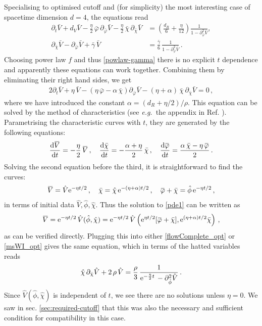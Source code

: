 \documentclass[11pt]{book} %
\newcommand{\overbar}[1]{\mkern 1.5mu\overline{\mkern-1.5mu#1\mkern-1.5mu}\mkern 1.5mu}
\newcommand{\bV}{\overbar V}
\newcommand{\bp}{\overbar \varphi}
\newcommand\eg{\textit{e.g.}\ }
\newcommand{\bc}{\bar \chi}
\newcommand{\hV}{\hat V}
\newcommand{\hp}{\hat \phi}
\newcommand{\hc}{\hat \chi}
\numberwithin{equation}{chapter}
\begin{document}
Specialising to optimised cutoff and (for simplicity) the most interesting case of spacetime dimension $d=4$,
the equations read
\begin{align}
  \label{flowComplete_opt}
  \partial_t\bar{V}+
  d_V \bar V - \frac{\eta}{2} \, \bar \varphi \, \partial_{\bar\varphi}\bar V -\frac{\eta}{2} \, \bar \chi \, \partial_{\bar\chi}\bar V &= \left(  \frac{d_R}{6} + \frac{\eta}{12} \right) \frac{1}{1 -  \partial^2_{\bar\varphi}\bar V},\\
  \label{msWI_opt}
  \partial_{\bar\chi}\bar V - \partial_{\bar\varphi}\bar V + \bar{\gamma} \, \bar V &= \frac{\bar{\gamma}}{6} \, \frac{1}{1 - \partial^2_{\bar\varphi}\bar V}\,.
\end{align}
Choosing power law $f$ and thus \eqref{powlaw-gamma} there is no explicit $t$ dependence and apparently
these equations can work together. Combining them by eliminating their right hand sides, we get
\begin{align}
  \label{pde1}
  2\partial_t\bar{V}+\eta \, \bar{V}-\left(\eta \, \bar\varphi-\alpha \, \bc\right)\partial_{\bar{\varphi}}\bar{V}-(\eta+\alpha) \, \bar\chi \, \partial_{\bar{\chi}} \bar{V}=0\,,
\end{align}
where we have introduced the constant $\alpha = (d_R+\eta/2)/\rho$.
This equation can be solved by the method of characteristics
(see \eg the appendix in Ref. \cite{Dietz:2015owa}). Parametrising the characteristic curves with $t$, they are generated by the following equations:
\begin{align}
  \frac{\mathrm d\bV}{\mathrm dt} = -\frac{\eta}{2} \, \bV\,,
  \quad
  \frac{\mathrm d\bc}{\mathrm dt}=-\frac{\alpha+\eta}{2} \, \bc\,,
  \quad
  \frac{\mathrm d\bp}{\mathrm dt}=\frac{\alpha\,\bc-\eta\,\bp}{2}\,.
\end{align}
Solving the second equation before the third, it is straightforward to find the curves:
\begin{align}
  \bV = \hV {\rm e}^{-\eta t/2}\,,\quad \bc = \hc\, {\rm e}^{-(\eta+\alpha)t/2}\,,\quad \bp+\bc = \hp\, {\rm e}^{-\eta t/2}\,,
\end{align}
in terms of initial data $\hV,\hp,\hc$.
Thus the solution to \eqref{pde1} can be written as
\begin{align}
  \bV ={\rm e}^{-\eta t/2}\, \hV(\hp,\hc) ={\rm e}^{-\eta t/2} \,\hV\left({\rm e}^{\eta t/2}[\bp+\bc],{\rm e}^{(\eta+\alpha)t/2}\bc\right)\,,
\end{align}
as can be verified directly. Plugging this into either \eqref{flowComplete_opt} or \eqref{msWI_opt}
gives the same equation, which in terms of the hatted variables reads
\begin{align}
  \hc \, \partial_{\hc}\hV + 2 \, \rho \, \hV = \frac{\rho}{3} \, \frac{1}{{\rm e}^{-\frac{\eta}{2} t} \,-\partial^2_{\hp}\hV}\,.
\end{align}
Since $\hV(\hp,\hc)$ is independent of $t$, we see there are no solutions unless $\eta=0$.
We saw in sec. \ref{sec:required-cutoff} that this was also the necessary and sufficient condition for
compatibility in this case.
\end{document}
